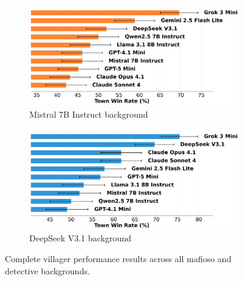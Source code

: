 \documentclass{article}
\begin{document}
\begin{figure}[htbp]
    \begin{subfigure}[b]{0.48\textwidth}
        \centering
        \includegraphics[width=\textwidth]{../results/win_rates_detect_mistral_7b_instruct.png}
        \caption{Mistral 7B Instruct background}
        \label{fig:villager_mistral_appendix}
    \end{subfigure}
    \hfill
    \begin{subfigure}[b]{0.48\textwidth}
        \centering
        \includegraphics[width=\textwidth]{../results/win_rates_detect_deepseek_v31.png}
        \caption{DeepSeek V3.1 background}
        \label{fig:villager_deepseek_appendix}
    \end{subfigure}
    \caption{Complete villager performance results across all mafioso and detective backgrounds.}
    \label{fig:villager_complete}
\end{figure}
\end{document}
